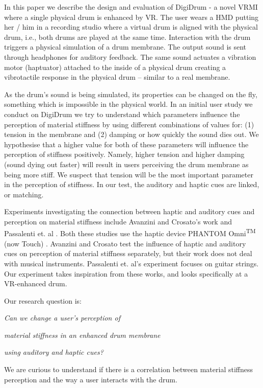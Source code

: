 \documentclass{article}
\begin{document}
In this paper we describe the design and evaluation of DigiDrum - a novel VRMI where a single physical drum is enhanced by VR. The user wears a HMD putting her / him in a recording studio where a virtual drum is aligned with the physical drum, i.e., both drums are played at the same time. Interaction with the drum triggers a physical simulation of a drum membrane. The output sound is sent through headphones for auditory feedback. The same sound actuates a vibration motor (haptuator) attached to the inside of a physical drum creating a vibrotactile response in the physical drum -- similar to a real membrane.

As the drum's sound is being simulated, its properties can be changed on the fly, something which is impossible in the physical world. In an initial user study we conduct on DigiDrum we try to understand which parameters influence the perception of material stiffness by using different combinations of values for: (1) tension in the membrane and (2) damping or how quickly the sound dies out. We hypothesise that a higher value for both of these parameters will influence the perception of stiffness positively. Namely, higher tension and higher damping (sound dying out faster) will result in users perceiving the drum membrane as being more stiff. We suspect that tension will be the most important parameter in the perception of stiffness. In our test, the auditory and haptic cues are linked, or matching. 

Experiments investigating the connection between haptic and auditory cues and perception on material stiffness include
Avanzini and Crosato's work \cite{avanzini2006} and Passalenti et. al  \cite{passalenti2019}. Both these studies use the haptic device PHANTOM\textregistered{} Omni\textsuperscript{TM} (now Touch) \cite{phantom}. Avanzini and Crosato test the influence of haptic and auditory cues on perception of material stiffness separately, but their work does not deal with musical instruments. Passalenti et. al's experiment focuses on guitar strings. Our experiment takes inspiration from these works, and looks specifically at a VR-enhanced drum.

Our research question is:
\vspace{0.2cm}

\centerline{\it Can we change a user's perception of}

\centerline{\it material stiffness in an enhanced drum membrane}

\centerline{\it using auditory and haptic cues?}
\vspace{0.2cm}
\noindent We are curious to understand if there is a correlation between material stiffness perception and the way a user interacts with the drum. 
\end{document}
